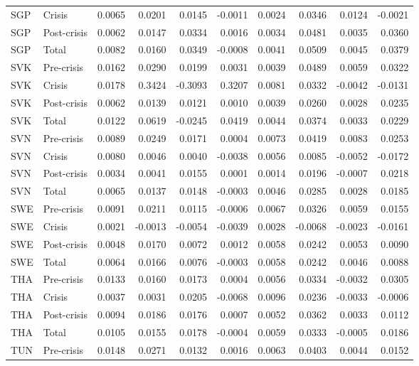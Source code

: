 \begin{longtable}[t]{llrrrrrrrr}
SGP & Crisis & 0.0065 & 0.0201 & 0.0145 & -0.0011 & 0.0024 & 0.0346 & 0.0124 & -0.0021\\
SGP & Post-crisis & 0.0062 & 0.0147 & 0.0334 & 0.0016 & 0.0034 & 0.0481 & 0.0035 & 0.0360\\
SGP & Total & 0.0082 & 0.0160 & 0.0349 & -0.0008 & 0.0041 & 0.0509 & 0.0045 & 0.0379\\
\addlinespace
SVK & Pre-crisis & 0.0162 & 0.0290 & 0.0199 & 0.0031 & 0.0039 & 0.0489 & 0.0059 & 0.0322\\
SVK & Crisis & 0.0178 & 0.3424 & -0.3093 & 0.3207 & 0.0081 & 0.0332 & -0.0042 & -0.0131\\
SVK & Post-crisis & 0.0062 & 0.0139 & 0.0121 & 0.0010 & 0.0039 & 0.0260 & 0.0028 & 0.0235\\
SVK & Total & 0.0122 & 0.0619 & -0.0245 & 0.0419 & 0.0044 & 0.0374 & 0.0033 & 0.0229\\
SVN & Pre-crisis & 0.0089 & 0.0249 & 0.0171 & 0.0004 & 0.0073 & 0.0419 & 0.0083 & 0.0253\\
\addlinespace
SVN & Crisis & 0.0080 & 0.0046 & 0.0040 & -0.0038 & 0.0056 & 0.0085 & -0.0052 & -0.0172\\
SVN & Post-crisis & 0.0034 & 0.0041 & 0.0155 & 0.0001 & 0.0014 & 0.0196 & -0.0007 & 0.0218\\
SVN & Total & 0.0065 & 0.0137 & 0.0148 & -0.0003 & 0.0046 & 0.0285 & 0.0028 & 0.0185\\
SWE & Pre-crisis & 0.0091 & 0.0211 & 0.0115 & -0.0006 & 0.0067 & 0.0326 & 0.0059 & 0.0155\\
SWE & Crisis & 0.0021 & -0.0013 & -0.0054 & -0.0039 & 0.0028 & -0.0068 & -0.0023 & -0.0161\\
\addlinespace
SWE & Post-crisis & 0.0048 & 0.0170 & 0.0072 & 0.0012 & 0.0058 & 0.0242 & 0.0053 & 0.0090\\
SWE & Total & 0.0064 & 0.0166 & 0.0076 & -0.0003 & 0.0058 & 0.0242 & 0.0046 & 0.0088\\
THA & Pre-crisis & 0.0133 & 0.0160 & 0.0173 & 0.0004 & 0.0056 & 0.0334 & -0.0032 & 0.0305\\
THA & Crisis & 0.0037 & 0.0031 & 0.0205 & -0.0068 & 0.0096 & 0.0236 & -0.0033 & -0.0006\\
THA & Post-crisis & 0.0094 & 0.0186 & 0.0176 & 0.0007 & 0.0052 & 0.0362 & 0.0033 & 0.0112\\
\addlinespace
THA & Total & 0.0105 & 0.0155 & 0.0178 & -0.0004 & 0.0059 & 0.0333 & -0.0005 & 0.0186\\
TUN & Pre-crisis & 0.0148 & 0.0271 & 0.0132 & 0.0016 & 0.0063 & 0.0403 & 0.0044 & 0.0152\\

\end{longtable}
